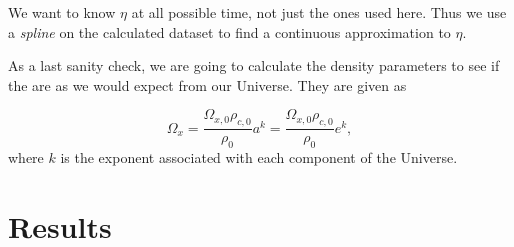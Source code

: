 \documentclass[a4paper,norsk, 10pt]{article}
\begin{document}
We want to know $\eta$ at all possible time, not just the ones used here. Thus we use a \textit{spline} on the calculated dataset to find a continuous approximation to $\eta$.


As a last sanity check, we are going to calculate the density parameters to see if the are as we would expect from our Universe. They are given as

\begin{equation}
\Omega_{x} = \frac{\Omega_{x,0}\rho_{c,0}}{\rho_{0}} a^{k} = \frac{\Omega_{x,0}\rho_{c,0}}{\rho_{0}} e^{k},
\end{equation}
where $k$ is the exponent associated with each component of the Universe.


\newpage

\section{Results}
\end{document}
